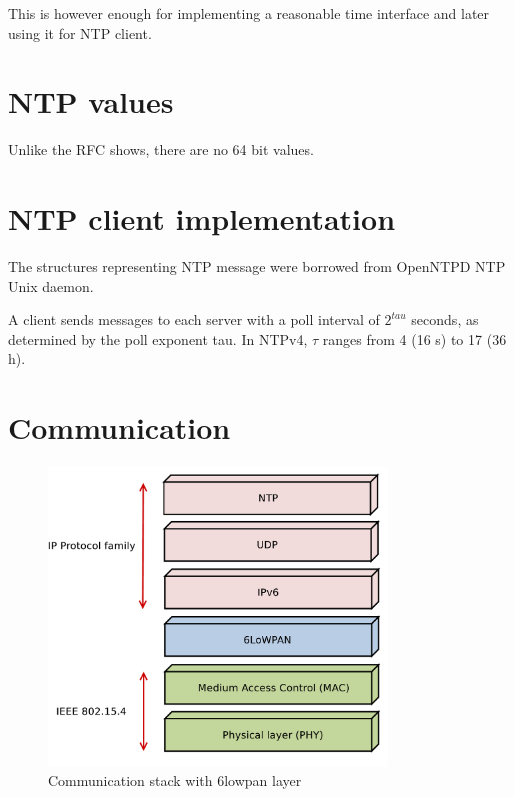 
This is however enough for implementing a reasonable time interface and later using it for NTP client.



\section{NTP values}
Unlike the RFC shows, there are no 64 bit values. %


\section{NTP client implementation}
The structures representing NTP message were borrowed from OpenNTPD NTP Unix daemon.

A client sends messages to each server with a poll interval of $2^{tau}$
seconds, as determined by the poll exponent tau.
In NTPv4, $\tau$ ranges from 4 (16 s) to 17 (36 h).

\section{Communication}
\begin{figure}
  \centering
  \includegraphics[width=9cm,keepaspectratio]{fig/6lowpan.pdf}
  \caption{Communication stack with 6lowpan layer}
  \label{fig:ntp-hierarchy}
  \bigskip
\end{figure}


